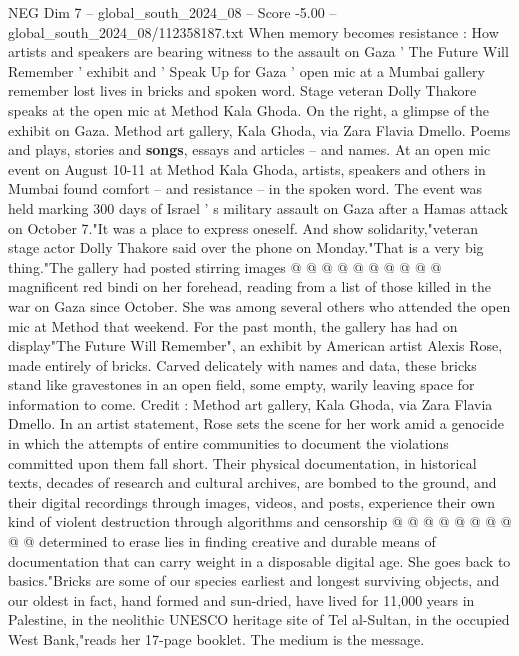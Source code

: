 \begin{textsample}{NEG Dim 7 – global\_south\_2024\_08 – Score -5.00 – global\_south\_2024\_08/112358187.txt}  \label{ex:f7_neg_374}
When memory becomes resistance : How artists and speakers are bearing witness to the assault on Gaza ' The Future Will Remember ' exhibit and ' Speak Up for Gaza ' open mic at a Mumbai gallery remember lost lives in bricks and spoken word.
Stage veteran Dolly Thakore speaks at the open mic at Method Kala Ghoda.
On the right, a glimpse of the exhibit on Gaza.
Method art gallery, Kala Ghoda, via Zara Flavia Dmello.
Poems and plays, stories and \textbf{songs}, essays and articles -- and names.
At an open mic event on August 10-11 at Method Kala Ghoda, artists, speakers and others in Mumbai found comfort -- and resistance -- in the spoken word.
The event was held marking 300 days of Israel ' s military assault on Gaza after a Hamas attack on October 7."It was a place to express oneself.
And show solidarity,"veteran stage actor Dolly Thakore said over the phone on Monday."That is a very big thing."The gallery had posted stirring images @ @ @ @ @ @ @ @ @ @ magnificent red bindi on her forehead, reading from a list of those killed in the war on Gaza since October.
She was among several others who attended the open mic at Method that weekend.
For the past month, the gallery has had on display"The Future Will Remember", an exhibit by American artist Alexis Rose, made entirely of bricks.
Carved delicately with names and data, these bricks stand like gravestones in an open field, some empty, warily leaving space for information to come.
Credit : Method art gallery, Kala Ghoda, via Zara Flavia Dmello.
In an artist statement, Rose sets the scene for her work amid a genocide in which the attempts of entire communities to document the violations committed upon them fall short.
Their physical documentation, in historical texts, decades of research and cultural archives, are bombed to the ground, and their digital recordings through images, videos, and posts, experience their own kind of violent destruction through algorithms and censorship @ @ @ @ @ @ @ @ @ @ determined to erase lies in finding creative and durable means of documentation that can carry weight in a disposable digital age.
She goes back to basics."Bricks are some of our species earliest and longest surviving objects, and our oldest in fact, hand formed and sun-dried, have lived for 11,000 years in Palestine, in the neolithic UNESCO heritage site of Tel al-Sultan, in the occupied West Bank,"reads her 17-page booklet.
The medium is the message.

\end{textsample}
